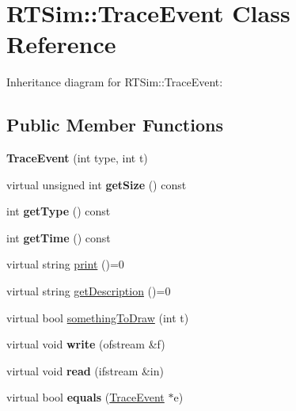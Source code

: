 \hypertarget{classRTSim_1_1TraceEvent}{}\section{R\+T\+Sim\+:\+:Trace\+Event Class Reference}
\label{classRTSim_1_1TraceEvent}


Inheritance diagram for R\+T\+Sim\+:\+:Trace\+Event\+:
\subsection*{Public Member Functions}
\begin{DoxyCompactItemize}
\item 
{\bfseries Trace\+Event} (int type, int t)\hypertarget{classRTSim_1_1TraceEvent_a32172a8a72bef9cf27aefb4141897dc0}{}\label{classRTSim_1_1TraceEvent_a32172a8a72bef9cf27aefb4141897dc0}

\item 
virtual unsigned int {\bfseries get\+Size} () const \hypertarget{classRTSim_1_1TraceEvent_a315e9226dae2af7de2a18ba8782009b7}{}\label{classRTSim_1_1TraceEvent_a315e9226dae2af7de2a18ba8782009b7}

\item 
int {\bfseries get\+Type} () const \hypertarget{classRTSim_1_1TraceEvent_aff786d48ce1382b0dca68d0bf954c227}{}\label{classRTSim_1_1TraceEvent_aff786d48ce1382b0dca68d0bf954c227}

\item 
int {\bfseries get\+Time} () const \hypertarget{classRTSim_1_1TraceEvent_ae4b668a5a555d22437d7c183e4bdbb28}{}\label{classRTSim_1_1TraceEvent_ae4b668a5a555d22437d7c183e4bdbb28}

\item 
virtual string \hyperlink{classRTSim_1_1TraceEvent_a98054981b3e797e63b77019ef1efea9b}{print} ()=0
\item 
virtual string \hyperlink{classRTSim_1_1TraceEvent_a2ab0e2081aec68b6cf439c703f6e3010}{get\+Description} ()=0
\item 
virtual bool \hyperlink{classRTSim_1_1TraceEvent_a3b001f78f81269d62ef81e893923dd57}{something\+To\+Draw} (int t)
\item 
virtual void {\bfseries write} (ofstream \&f)\hypertarget{classRTSim_1_1TraceEvent_a541ee0c5c681e1d50ec4b7212fbd6946}{}\label{classRTSim_1_1TraceEvent_a541ee0c5c681e1d50ec4b7212fbd6946}

\item 
virtual void {\bfseries read} (ifstream \&in)\hypertarget{classRTSim_1_1TraceEvent_a3f1328d004f8f9c842707b5a9aec1072}{}\label{classRTSim_1_1TraceEvent_a3f1328d004f8f9c842707b5a9aec1072}

\item 
virtual bool {\bfseries equals} (\hyperlink{classRTSim_1_1TraceEvent}{Trace\+Event} $\ast$e)\hypertarget{classRTSim_1_1TraceEvent_aa86a007946f88e9ff9a031c85ca63ea3}{}\label{classRTSim_1_1TraceEvent_aa86a007946f88e9ff9a031c85ca63ea3}

\end{DoxyCompactItemize}
